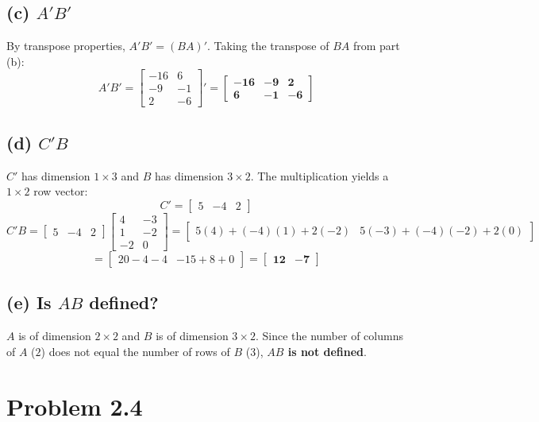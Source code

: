 \documentclass[11pt]{article}
\begin{document}
\subsection*{(c) $A'B'$}
By transpose properties, $A'B' = (BA)'$. Taking the transpose of $BA$ from part (b):
\[
A'B' = \begin{bmatrix} -16 & 6 \\ -9 & -1 \\ 2 & -6 \end{bmatrix}' 
= \mathbf{\begin{bmatrix} -16 & -9 & 2 \\ 6 & -1 & -6 \end{bmatrix}}
\]

\subsection*{(d) $C'B$}
$C'$ has dimension $1 \times 3$ and $B$ has dimension $3 \times 2$. The multiplication yields a $1 \times 2$ row vector:
\[
C' = \begin{bmatrix} 5 & -4 & 2 \end{bmatrix}
\]
\[
C'B = \begin{bmatrix} 5 & -4 & 2 \end{bmatrix} \begin{bmatrix} 4 & -3 \\ 1 & -2 \\ -2 & 0 \end{bmatrix}
= \begin{bmatrix} 5(4) + (-4)(1) + 2(-2) & 5(-3) + (-4)(-2) + 2(0) \end{bmatrix}
\]
\[
= \begin{bmatrix} 20 - 4 - 4 & -15 + 8 + 0 \end{bmatrix} 
= \mathbf{\begin{bmatrix} 12 & -7 \end{bmatrix}}
\]

\subsection*{(e) Is $AB$ defined?}
$A$ is of dimension $2 \times 2$ and $B$ is of dimension $3 \times 2$. 
Since the number of columns of $A$ ($2$) does not equal the number of rows of $B$ ($3$), \textbf{$AB$ is not defined}.

\section*{Problem 2.4}
\end{document}
